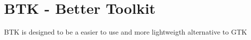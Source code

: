 \chapter{BTK -\/ Better Toolkit}
\hypertarget{md_README}{}\label{md_README}
\label{md_README_autotoc_md0}%
%
 BTK is designed to be a easier to use and more lightweigth alternative to GTK 